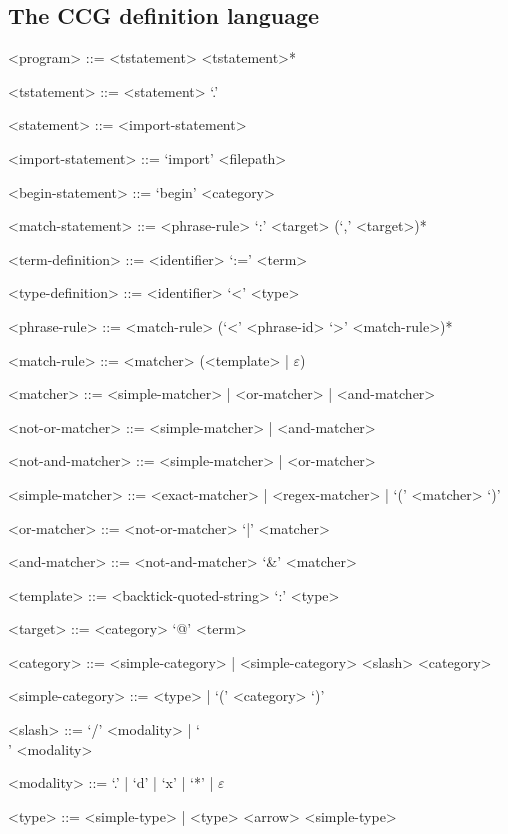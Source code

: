 \documentclass[main.tex]{subfiles}
\begin{document}
\subsection{The CCG definition language}
\begin{grammar}
    <program> ::= <tstatement> <tstatement>*

    <tstatement> ::= <statement> `.'

    <statement>  ::= <import-statement>

    <import-statement> ::= `import' <filepath>

    <begin-statement>  ::= `begin' <category>

    <match-statement>  ::= <phrase-rule> `:' <target> (`,' <target>)*

    <term-definition>  ::= <identifier> `:=' <term>

    <type-definition>  ::= <identifier> `<' <type>

    <phrase-rule> ::= <match-rule> (`<' <phrase-id> `>' <match-rule>)*

    <match-rule> ::= <matcher> (<template> | $\varepsilon$)

    <matcher> ::= <simple-matcher> | <or-matcher> | <and-matcher>

    <not-or-matcher> ::= <simple-matcher> | <and-matcher>

    <not-and-matcher> ::= <simple-matcher> | <or-matcher>

    <simple-matcher> ::= <exact-matcher> | <regex-matcher> | `(' <matcher> `)'

    <or-matcher> ::= <not-or-matcher> `|' <matcher>

    <and-matcher> ::= <not-and-matcher> `\&' <matcher>

    <template> ::= <backtick-quoted-string> `:' <type>

    <target> ::= <category> `@' <term>

    <category> ::= <simple-category> | <simple-category> <slash> <category>

    <simple-category> ::= <type> | `(' <category> `)'

    <slash> ::= `/' <modality> | `\\' <modality>

    <modality> ::= `.' | `d' | `x' | `*' | $\varepsilon$

    <type> ::= <simple-type> | <type> <arrow> <simple-type>


\end{grammar}
\end{document}

